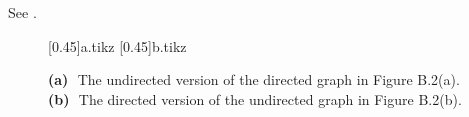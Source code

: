 See .
\begin{figure}[htb]
    \subcaptionbox{\label{fig:B.4-5a}}[0.45\textwidth]{{a.tikz}}
    \subcaptionbox{\label{fig:B.4-5b}}[0.45\textwidth]{{b.tikz}}
    \caption{\textbf{(a)}\,~The undirected version of the directed graph in Figure B.2(a).\,
    \textbf{(b)}\,~The directed version of the undirected graph in Figure B.2(b).} \label{fig:B.4-5}
\end{figure}
